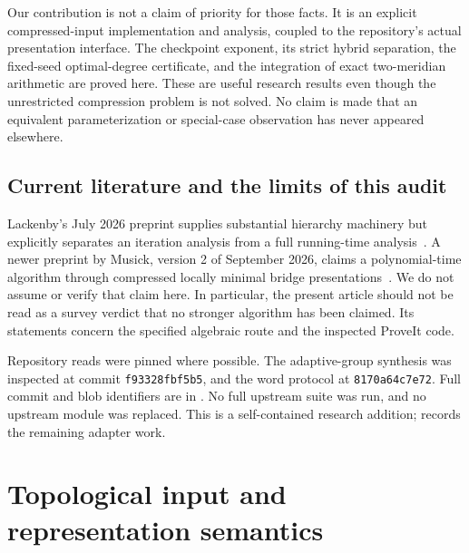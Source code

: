 \documentclass[11pt]{article}
\theoremstyle{definition}
\theoremstyle{remark}
\begin{document}
Our contribution is not a claim of priority for those facts. It is an explicit compressed-input implementation and analysis, coupled to the repository's actual presentation interface. The checkpoint exponent, its strict hybrid separation, the fixed-seed optimal-degree certificate, and the integration of exact two-meridian arithmetic are proved here. These are useful research results even though the unrestricted compression problem is not solved. No claim is made that an equivalent parameterization or special-case observation has never appeared elsewhere.

\subsection{Current literature and the limits of this audit}
Lackenby's July 2026 preprint supplies substantial hierarchy machinery but explicitly separates an iteration analysis from a full running-time analysis~\cite{lackenby2026}. A newer preprint by Musick, version 2 of September 2026, claims a polynomial-time algorithm through compressed locally minimal bridge presentations~\cite{musick}. We do not assume or verify that claim here. In particular, the present article should not be read as a survey verdict that no stronger algorithm has been claimed. Its statements concern the specified algebraic route and the inspected ProveIt code.

Repository reads were pinned where possible. The adaptive-group synthesis was inspected at commit \texttt{f93328fbf5b5}, and the word protocol at \texttt{8170a64c7e72}. Full commit and blob identifiers are in . No full upstream suite was run, and no upstream module was replaced. This is a self-contained research addition;  records the remaining adapter work.

\section{Topological input and representation semantics}
\label{sec:semantics}
\end{document}
